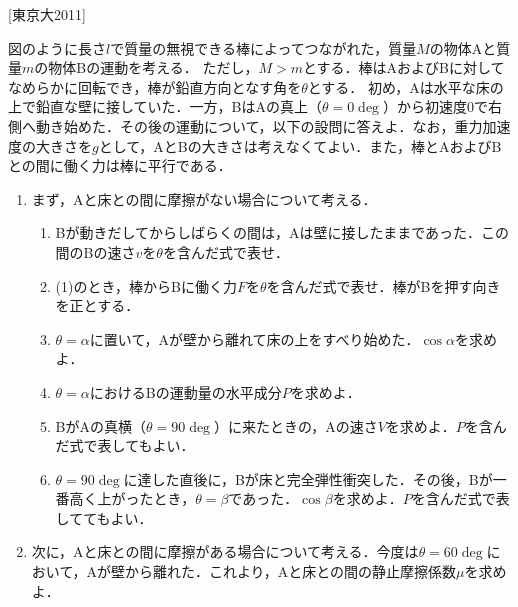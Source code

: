 

\noindent
{} [東京大2011]

図のように長さ$l$で質量の無視できる棒によってつながれた，質量$M$の物体Aと質量$m$の物体Bの運動を考える．
ただし，$M > m$とする．棒はAおよびBに対してなめらかに回転でき，棒が鉛直方向となす角を$\theta$とする．
初め，Aは水平な床の上で鉛直な壁に接していた．一方，BはAの真上（$\theta= 0 \deg$）から初速度0で右側へ動き始めた．その後の運動について，以下の設問に答えよ．なお，重力加速度の大きさを$g$として，AとBの大きさは考えなくてよい．また，棒とAおよびBとの間に働く力は棒に平行である．

\begin{enumerate}[label=\textbf{問\arabic*}]
  \item {\hzw}まず，Aと床との間に摩擦がない場合について考える．
  \begin{enumerate}[(1)]
    \item {\hzw}Bが動きだしてからしばらくの間は，Aは壁に接したままであった．この間のBの速さ$v$を$\theta$を含んだ式で表せ．
    \item {\hzw}(1)のとき，棒からBに働く力$F$を$\theta$を含んだ式で表せ．棒がBを押す向きを正とする．
    \item {\hzw}$\theta = \alpha$に置いて，Aが壁から離れて床の上をすべり始めた．$\cos \alpha$を求めよ．
    \item {\hzw}$\theta = \alpha$におけるBの運動量の水平成分$P$を求めよ．
    \item {\hzw}BがAの真横（$\theta = 90 \deg$）に来たときの，Aの速さ$V$を求めよ．$P$を含んだ式で表してもよい．
    \item {\hzw}$\theta = 90 \deg$に達した直後に，Bが床と完全弾性衝突した．その後，Bが一番高く上がったとき，$\theta = \beta$であった．$\cos \beta$を求めよ．$P$を含んだ式で表しててもよい．
  \end{enumerate}
  \item {\hzw}次に，Aと床との間に摩擦がある場合について考える．今度は$\theta = 60 \deg$において，Aが壁から離れた．これより，Aと床との間の静止摩擦係数$\mu$を求めよ．
\end{enumerate}



 